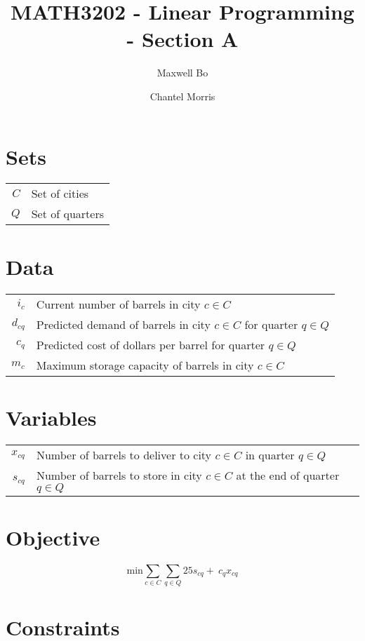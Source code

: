\documentclass[a4paper]{article}
\title{MATH3202 - Linear Programming - Section A}
\author{Maxwell Bo  \and Chantel Morris}
\begin{document}
 

\maketitle

\section*{Sets}

\begin{tabular}{rl}
    $C$ & Set of cities\\
    $Q$ & Set of quarters
\end{tabular}

\section*{Data}

\begin{tabular}{rl}
    $i_c$ & Current number of barrels in city $c \in C$\\
    $d_{cq}$ & Predicted demand of barrels in city $c \in C$ for quarter $q \in Q$\\
    $c_q$ & Predicted cost of dollars per barrel for quarter $q \in Q$\\
    $m_c$ & Maximum storage capacity of barrels in city $c \in C$
\end{tabular}

\section*{Variables}

\begin{tabular}{rl}
    $x_{cq}$ & Number of barrels to deliver to city $c \in C$ in quarter $q \in Q$\\
    $s_{cq}$ & Number of barrels to store in city $c \in C$ at the end of quarter $q \in Q$\\
\end{tabular}

\section*{Objective}

\[
\text{min} \sum_{c \in C}\sum_{q \in Q} 25 s_{cq} +\: c_q x_{cq}
\]

\section*{Constraints}
\end{document}
